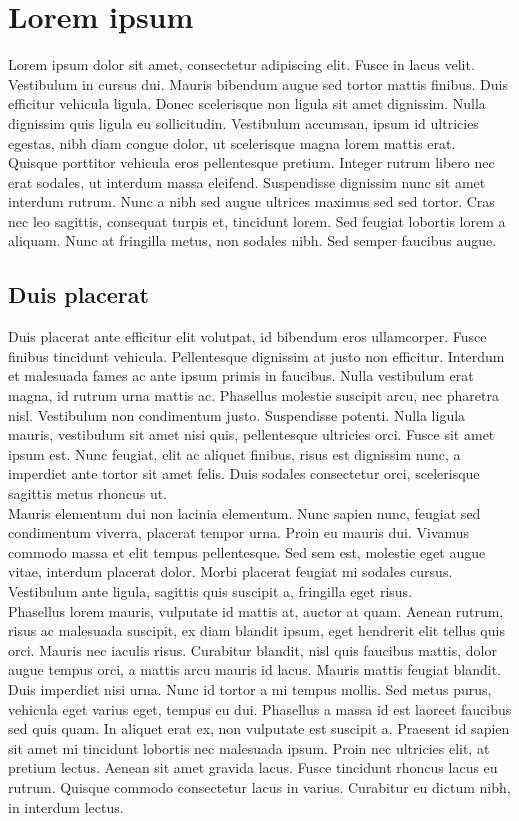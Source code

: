 \section{Lorem ipsum}
Lorem ipsum dolor sit amet, consectetur adipiscing elit. Fusce in lacus velit.
Vestibulum in cursus dui. Mauris bibendum augue sed tortor mattis finibus. Duis
efficitur vehicula ligula. Donec scelerisque non ligula sit amet dignissim.
Nulla dignissim quis ligula eu sollicitudin. Vestibulum accumsan, ipsum id
ultricies egestas, nibh diam congue dolor, ut scelerisque magna lorem mattis
erat. \\

Quisque porttitor vehicula eros pellentesque pretium. Integer rutrum libero nec
erat sodales, ut interdum massa eleifend. Suspendisse dignissim nunc sit amet
interdum rutrum. Nunc a nibh sed augue ultrices maximus sed sed tortor. Cras nec
leo sagittis, consequat turpis et, tincidunt lorem. Sed feugiat lobortis lorem a
aliquam. Nunc at fringilla metus, non sodales nibh. Sed semper faucibus augue.

\subsection{Duis placerat}
Duis placerat ante efficitur elit volutpat, id bibendum eros ullamcorper. Fusce
finibus tincidunt vehicula. Pellentesque dignissim at justo non efficitur.
Interdum et malesuada fames ac ante ipsum primis in faucibus. Nulla vestibulum
erat magna, id rutrum urna mattis ac. Phasellus molestie suscipit arcu, nec
pharetra nisl. Vestibulum non condimentum justo. Suspendisse potenti. Nulla
ligula mauris, vestibulum sit amet nisi quis, pellentesque ultricies orci. Fusce
sit amet ipsum est. Nunc feugiat, elit ac aliquet finibus, risus est dignissim
nunc, a imperdiet ante tortor sit amet felis. Duis sodales consectetur orci,
scelerisque sagittis metus rhoncus ut. \\

Mauris elementum dui non lacinia elementum. Nunc sapien nunc, feugiat sed
condimentum viverra, placerat tempor urna. Proin eu mauris dui. Vivamus commodo
massa et elit tempus pellentesque. Sed sem est, molestie eget augue vitae,
interdum placerat dolor. Morbi placerat feugiat mi sodales cursus. Vestibulum
ante ligula, sagittis quis suscipit a, fringilla eget risus. \\

Phasellus lorem mauris, vulputate id mattis at, auctor at quam. Aenean rutrum,
risus ac malesuada suscipit, ex diam blandit ipsum, eget hendrerit elit tellus
quis orci. Mauris nec iaculis risus. Curabitur blandit, nisl quis faucibus
mattis, dolor augue tempus orci, a mattis arcu mauris id lacus. Mauris mattis
feugiat blandit. Duis imperdiet nisi urna. Nunc id tortor a mi tempus mollis.
Sed metus purus, vehicula eget varius eget, tempus eu dui. Phasellus a massa id
est laoreet faucibus sed quis quam. In aliquet erat ex, non vulputate est
suscipit a. Praesent id sapien sit amet mi tincidunt lobortis nec malesuada
ipsum. Proin nec ultricies elit, at pretium lectus. Aenean sit amet gravida
lacus. Fusce tincidunt rhoncus lacus eu rutrum. Quisque commodo consectetur
lacus in varius. Curabitur eu dictum nibh, in interdum lectus. \\
